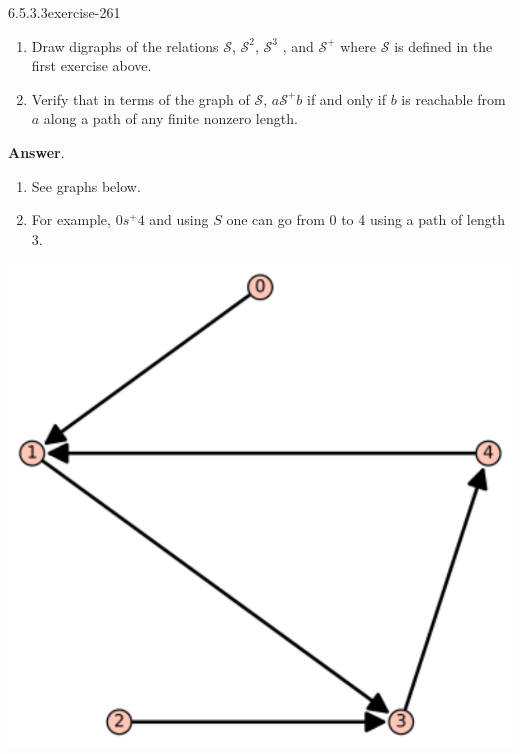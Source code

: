 \documentclass[twoside,10pt,]{book}
\numberwithin{equation}{section}
\begin{document}
\begin{divisionsolution}{6.5.3.3}{}{exercise-261}%
\hypertarget{p-2212}{}%
\leavevmode%
\begin{enumerate}[label=(\alph*)]
\item\hypertarget{li-1157}{}\hypertarget{p-2213}{}%
Draw digraphs of the relations \(\mathcal{S}\), \(\mathcal{S}^2\), \(\mathcal{S}^3\) , and \(\mathcal{S}^+\)  where \(\mathcal{S}\) is defined in the first exercise above.%
\item\hypertarget{li-1158}{}Verify that in terms of the graph of \(\mathcal{S}\), \(a \mathcal{S}^+ b\) if and only if \(b\) is reachable from \(a\) along a path of any finite nonzero length.%
\end{enumerate}
%
\par\smallskip%
\noindent\textbf{Answer}.\quad%
\hypertarget{p-2214}{}%
\leavevmode%
\begin{enumerate}[label=(\alph*)]
\item\hypertarget{li-1159}{}\hypertarget{p-2215}{}%
See graphs below.%
\item\hypertarget{li-1160}{}\hypertarget{p-2216}{}%
For example, \(0 s^+ 4\) and using \(S\) one can go from 0 to 4 using a path of length 3.%
\end{enumerate}
%
\begin{sidebyside}{2}{0.01}{0.01}{0.02}%
\begin{sbspanel}{0.48}%
\includegraphics[width=1\linewidth]{images/S65-3s}

\end{sbspanel}
\end{sidebyside}
\end{divisionsolution}
\end{document}
